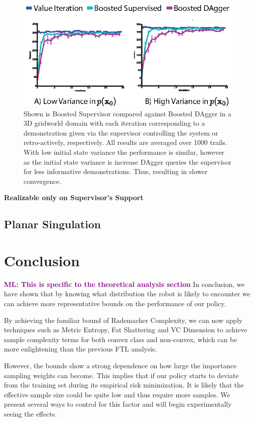 \documentclass[10pt, conference]{ieeeconf}      %
\newcommand{\mlnote}[1]{\ifthenelse{ \boolean{include-notes}}%
 {\textcolor{purple}{\textbf{ML: #1}}}{}}
\begin{document}
\begin{figure}
\centering
\includegraphics{f_figs/r_ev.eps}
\caption{
    \footnotesize
Shown is Boosted Supervisor compared against Boosted DAgger in a 3D gridworld domain with each iteration corresponding to a demonstration given via the supervisor controlling the system or retro-actively, respectively. All results are averaged over 1000 trails. With low initial state variance the performance is similar, however as the initial state variance is increase DAgger queries the supervisor for less informative demonstrations. Thus, resulting in slower convergence.   }
\vspace*{-20pt}
\label{fig:r_eq}
\end{figure}



\noindent \textbf{Realizable only on Supervisor's Support} 


\subsection{Planar Singulation}




  



\section{Conclusion}
\mlnote{This is specific to the theoretical analysis section}
In conclusion, we have shown that by knowing what distribution the robot is likely to encounter we can achieve more representative bounds on the performance of our policy. 

By achieving the familiar bound of Rademacher Complexity, we can now apply techniques such as Metric Entropy, Fat Shattering and VC Dimension to achieve sample complexity terms for both convex class and non-convex, which can be more enlightening than the previous FTL analysis. 

However, the bounds show a strong dependence on how large the importance sampling weights can become. This implies that if our policy starts to deviate from the training set during its empirical risk minimization. It is likely that the effective sample size could be quite low and thus require more samples. We present several ways to control for this factor and will begin experimentally seeing the effects.  



\end{document}
